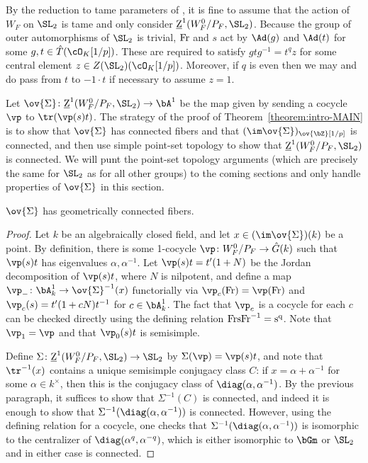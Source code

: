 By the reduction to tame parameters of \cite[\S 4.1]{DHKM}, it is fine to assume that the action of $W_F$ on $\SL_2$ is tame and only consider $\underline{\rm{Z}}^1(W_F^0/P_F, \SL_2)$. Because the group of outer automorphisms of $\SL_2$ is trivial, $\rm{Fr}$ and $s$ act by $\Ad(g)$ and $\Ad(t)$ for some $g, t \in \hat{T}(\cO_K[1/p])$. These are required to satisfy $gtg^{-1} = t^q z$ for some central element $z \in Z(\SL_2)(\cO_K[1/p])$. Moreover, if $q$ is even then we may and do pass from $t$ to $-1 \cdot t$ if necessary to assume $z = 1$. \smallskip

Let $\ov{\Sigma}\colon \underline{\rm{Z}}^1(W_F^0/P_F, \SL_2) \to \bA^1$ be the map given by sending a cocycle $\vp$ to $\tr(\vp(s)t)$. The strategy of the proof of Theorem~\ref{theorem:intro-MAIN} is to show that $\ov{\Sigma}$ has connected fibers and that $(\im \ov{\Sigma})_{\ov{\bZ}[1/p]}$ is connected, and then use simple point-set topology to show that $\underline{\rm{Z}}^1(W_F^0/P_F, \SL_2)$ is connected. We will punt the point-set topology arguments (which are precisely the same for $\SL_2$ as for all other groups) to the coming sections and only handle properties of $\ov{\Sigma}$ in this section.

\begin{claim}\label{claim:conn-fibers}
    $\ov{\Sigma}$ has geometrically connected fibers.
\end{claim}

\begin{proof}
    Let $k$ be an algebraically closed field, and let $x \in (\im \ov{\Sigma})(k)$ be a point. By definition, there is some 1-cocycle $\vp\colon W_F^0/P_F \to \hat{G}(k)$ such that $\vp(s)t$ has eigenvalues $\alpha, \alpha^{-1}$. Let $\vp(s)t = t'(1+N)$ be the Jordan decomposition of $\vp(s)t$, where $N$ is nilpotent, and define a map $\vp_{-}\colon \bA_k^1 \to \ov{\Sigma}^{-1}(x)$ functorially via $\vp_c(\rm{Fr}) = \vp(\rm{Fr})$ and $\vp_c(s) = t'(1 + cN)t^{-1}$ for $c \in \bA_k^1$. The fact that $\vp_c$ is a cocycle for each $c$ can be checked directly using the defining relation $\rm{Fr} s \rm{Fr}^{-1} = s^q$. Note that $\vp_1 = \vp$ and that $\vp_0(s)t$ is semisimple.\smallskip

    Define $\Sigma\colon \underline{\rm{Z}}^1(W_F^0/P_F, \SL_2) \to \SL_2$ by $\Sigma(\vp) = \vp(s)t$, and note that $\tr^{-1}(x)$ contains a unique semisimple conjugacy class $C$: if $x = \alpha + \alpha^{-1}$ for some $\alpha \in k^\times$, then this is the conjugacy class of $\diag(\alpha, \alpha^{-1})$. By the previous paragraph, it suffices to show that $\Sigma^{-1}(C)$ is connected, and indeed it is enough to show that $\Sigma^{-1}(\diag(\alpha, \alpha^{-1}))$ is connected. However, using the defining relation for a cocycle, one checks that $\Sigma^{-1}(\diag(\alpha, \alpha^{-1}))$ is isomorphic to the centralizer of $\diag(\alpha^q, \alpha^{-q})$, which is either isomorphic to $\bGm$ or $\SL_2$ and in either case is connected.
\end{proof}

